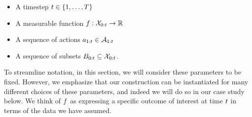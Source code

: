 % 
% 
% 
% 
% 
% 
\begin{multicols}{2}
    \begin{itemize}
        \item A timestep $t \in \{1, \ldots, T\}$
        \item A measurable function $f : \mathcal{X}_{0:t} \to \mathbb{R}$
    \end{itemize}
    \columnbreak
    \begin{itemize}
        \item A sequence of actions $a_{1:t} \in \mathcal{A}_{1:t}$
        \item A sequence of subsets $B_{0:t} \subseteq \mathcal{X}_{0:t}$. 
    \end{itemize}
\end{multicols}
% 
\noindent
To streamline notation, in this section, we will consider these parameters to be fixed.
However, we emphasize that our construction can be instantiated for many different choices of these parameters, and indeed we will do so in our case study below.
We think of $f$ as expressing a specific outcome of interest at time $t$ in terms of the data we have assumed.
